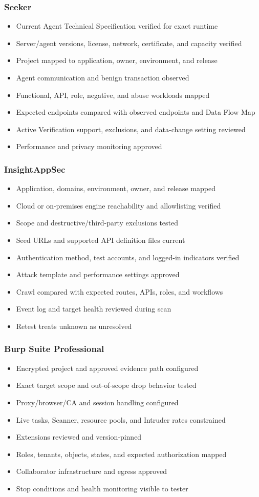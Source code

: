 \documentclass[11pt,letterpaper]{article}
\newcommand{\checkitem}{\item[$\square$]}
\begin{document}
\subsubsection{Seeker}
\begin{itemize}
  \checkitem Current Agent Technical Specification verified for exact runtime
  \checkitem Server/agent versions, license, network, certificate, and capacity verified
  \checkitem Project mapped to application, owner, environment, and release
  \checkitem Agent communication and benign transaction observed
  \checkitem Functional, API, role, negative, and abuse workloads mapped
  \checkitem Expected endpoints compared with observed endpoints and Data Flow Map
  \checkitem Active Verification support, exclusions, and data-change setting reviewed
  \checkitem Performance and privacy monitoring approved
\end{itemize}

\subsubsection{InsightAppSec}
\begin{itemize}
  \checkitem Application, domains, environment, owner, and release mapped
  \checkitem Cloud or on-premises engine reachability and allowlisting verified
  \checkitem Scope and destructive/third-party exclusions tested
  \checkitem Seed URLs and supported API definition files current
  \checkitem Authentication method, test accounts, and logged-in indicators verified
  \checkitem Attack template and performance settings approved
  \checkitem Crawl compared with expected routes, APIs, roles, and workflows
  \checkitem Event log and target health reviewed during scan
  \checkitem Retest treats unknown as unresolved
\end{itemize}

\subsubsection{Burp Suite Professional}
\begin{itemize}
  \checkitem Encrypted project and approved evidence path configured
  \checkitem Exact target scope and out-of-scope drop behavior tested
  \checkitem Proxy/browser/CA and session handling configured
  \checkitem Live tasks, Scanner, resource pools, and Intruder rates constrained
  \checkitem Extensions reviewed and version-pinned
  \checkitem Roles, tenants, objects, states, and expected authorization mapped
  \checkitem Collaborator infrastructure and egress approved
  \checkitem Stop conditions and health monitoring visible to tester
\end{itemize}
\end{document}
